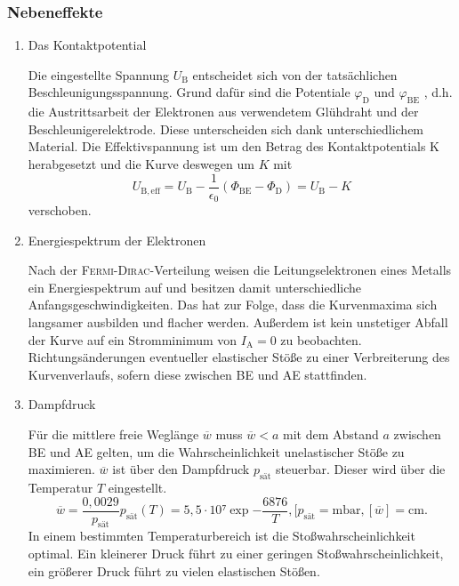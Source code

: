 \subsubsection{Nebeneffekte}
\begin{enumerate}
\item{Das Kontaktpotential}

Die eingestellte Spannung $U_\mathup{B}$ entscheidet sich von der tatsächlichen Beschleunigungsspannung. 
Grund dafür sind die Potentiale $\varphi_\mathup{D}$ und $\varphi_\mathup{BE}$ , d.h. die Austrittsarbeit der Elektronen aus verwendetem Glühdraht und der Beschleunigerelektrode. 
Diese unterscheiden sich dank unterschiedlichem Material.
Die Effektivspannung ist um den Betrag des Kontaktpotentials K herabgesetzt und die Kurve deswegen um $K$ mit
\begin{equation}
	U_\mathup{B,eff}=U_\mathup{B}-\frac{1}{\epsilon_0}(\Phi_\mathup{BE}-\Phi_\mathup{D})=U_\mathup{B}-K
\end{equation}
verschoben.
\item{Energiespektrum der Elektronen}

Nach der \textsc{Fermi}-\textsc{Dirac}-Verteilung weisen die Leitungselektronen eines Metalls ein Energiespektrum auf und besitzen damit unterschiedliche Anfangsgeschwindigkeiten.
Das hat zur Folge, dass die Kurvenmaxima sich langsamer ausbilden und flacher werden. 
Außerdem ist kein unstetiger Abfall der Kurve auf ein Stromminimum von $I_\mathup{A}=0$ zu beobachten.
Richtungsänderungen eventueller elastischer Stöße zu einer Verbreiterung des Kurvenverlaufs, sofern diese zwischen BE und AE stattfinden. 
\item{Dampfdruck}

Für die mittlere freie Weglänge $\overline{w}$ muss $\overline{w} < a$ mit dem Abstand $a$ zwischen BE und AE gelten, um die Wahrscheinlichkeit unelastischer Stöße zu maximieren. 
$\overline{w}$ ist über den Dampfdruck $p_\mathup{sät}$ steuerbar. Dieser wird über die Temperatur $T$ eingestellt. 
\begin{equation}
	\overline{w}=\frac{0,0029}{p_\mathup{sät}}
	p_\mathup{sät}(T)=5,5\cdot 10⁷\exp{-\frac{6876}{T}}, [p_\mathup{sät}=\si{\milli\bar}, [\overline{w}]=\si{\centi\meter}.
\end{equation}
In einem bestimmten Temperaturbereich ist die Stoßwahrscheinlichkeit optimal.
Ein kleinerer Druck führt zu einer geringen Stoßwahrscheinlichkeit, ein größerer Druck führt zu vielen elastischen Stößen.
\end{enumerate}
